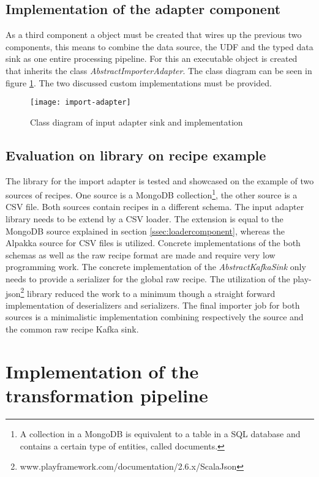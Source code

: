 \subsection{Implementation of the adapter component}

As a third component a object must be created that wires up the previous two components, this means to combine the data source, the UDF and the typed data sink as one entire processing pipeline. For this an executable object is created that inherits the class \textit{AbstractImporterAdapter}. The class diagram can be seen in figure \ref{fig:import-adapter}. The two discussed custom implementations must be provided.

\begin{figure}[htb]
  \centering
  \texttt{[image: import-adapter]}\\
  \caption{Class diagram of input adapter sink and implementation}
  \label{fig:import-adapter}
\end{figure}

\subsection{Evaluation on library on recipe example}
The library for the import adapter is tested and showcased on the example of two sources of recipes. One source is a MongoDB collection\footnote{A collection in a MongoDB is equivalent to a table in a SQL database and contains a certain type of entities, called documents.}, the other source is a CSV file. Both sources contain recipes in a different schema. The input adapter library needs to be extend by a CSV loader. The extension is equal to the MongoDB source explained in section \ref{ssec:loadercomponent}, whereas the Alpakka source for CSV files is utilized. Concrete implementations of the both schemas as well as the raw recipe format are made and require very low programming work. The concrete implementation of the \textit{AbstractKafkaSink} only needs to provide a serializer for the global raw recipe. The utilization of the play-json\footnote{www.playframework.com/documentation/2.6.x/ScalaJson} library reduced the work to a minimum though a straight forward implementation of deserializers and serializers. The final importer job for both sources is a minimalistic implementation combining respectively the source and the common raw recipe Kafka sink.

\section{Implementation of the transformation pipeline}


